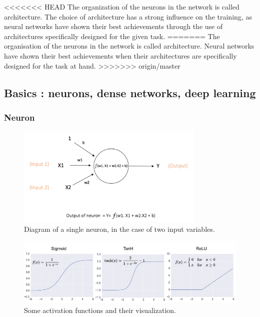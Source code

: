 <<<<<<< HEAD
The organization of the neurons in the network is called architecture. The choice of architecture has a strong influence on the training, as neural networks have shown their best achievements through the use of architectures specifically designed for the given task.
=======
The organisation of the neurons in the network is called architecture. Neural networks have shown their best achievements when their architectures are specifically designed for the task at hand.
>>>>>>> origin/master

\subsection{Basics : neurons, dense networks, deep learning}

\subsubsection{Neuron}

\begin{figure}
    \centering
    \includegraphics[width=0.8\textwidth]{Images/neuron_diagram}
    \caption{Diagram of a single neuron, in the case of two input variables.}
    \label{fig:neuron_diagram}
\end{figure}


\begin{figure}
    \centering
    \includegraphics[width=\textwidth]{Images/activation_functions.png}
    \caption{Some activation functions and their visualization.}
    \label{fig:activation_functions}
\end{figure}

